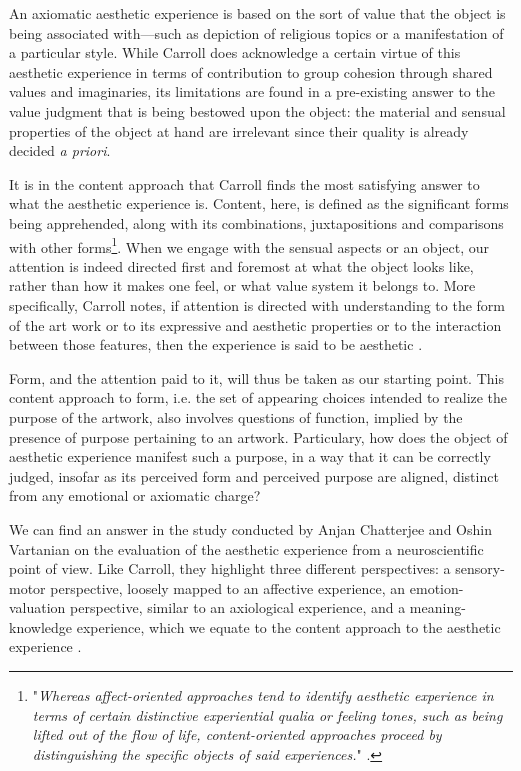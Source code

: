 An axiomatic aesthetic experience is based on the sort of value that the object is being associated with—such as depiction of religious topics or a manifestation of a particular style. While Carroll does acknowledge a certain virtue of this aesthetic experience in terms of contribution to group cohesion through shared values and imaginaries, its limitations are found in a pre-existing answer to the value judgment that is being bestowed upon the object: the material and sensual properties of the object at hand are irrelevant since their quality is already decided \emph{a priori}.

It is in the content approach that Carroll finds the most satisfying answer to what the aesthetic experience is. Content, here, is defined as the significant forms being apprehended, along with its combinations, juxtapositions and comparisons with other forms\footnote{"\emph{Whereas affect-oriented approaches tend to identify aesthetic experience in terms of certain distinctive experiential qualia or feeling tones, such as being lifted out of the flow of life, content-oriented approaches proceed by distinguishing the specific objects of said experiences.}" \citep{carroll_aesthetic_2002}.}. When we engage with the sensual aspects or an object, our attention is indeed directed first and foremost at what the object looks like, rather than how it makes one feel, or what value system it belongs to. More specifically, Carroll notes, if attention is directed with understanding to the form of the art work or to its expressive and aesthetic properties or to the interaction between those features, then the experience is said to be aesthetic \citep{carroll_aesthetic_2002}.

Form, and the attention paid to it, will thus be taken as our starting point.  This content approach to form, i.e. the set of appearing choices intended to realize the purpose of the artwork, also involves questions of function, implied by the presence of purpose pertaining to an artwork. Particulary, how does the object of aesthetic experience manifest such a purpose, in a way that it can be correctly judged, insofar as its perceived form and perceived purpose are aligned, distinct from any emotional or axiomatic charge?

We can find an answer in the study conducted by Anjan Chatterjee and Oshin Vartanian on the evaluation of the aesthetic experience from a neuroscientific point of view. Like Carroll, they highlight three different perspectives: a sensory-motor perspective, loosely mapped to an affective experience, an emotion-valuation perspective, similar to an axiological experience, and a meaning-knowledge experience, which we equate to the content approach to the aesthetic experience \citep{chatterjee_neuroscience_2016}.

